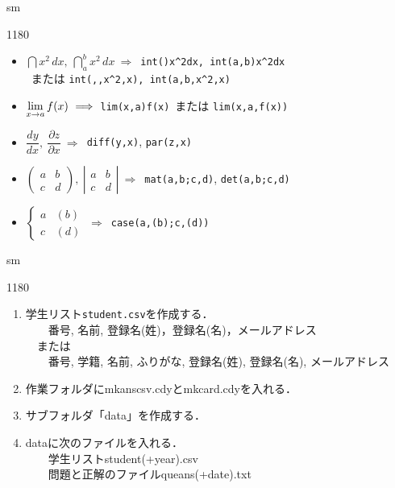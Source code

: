 \documentclass[landscape,10pt]{ujarticle}
\newcommand{\slidepage}[1][s]{%
\setcounter{ketpicctra}{18}%
\if#1m \setcounter{ketpicctra}{1}\fi
\hypersetup{linkcolor=black}%

\begin{layer}{118}{0}
\putnotee{122}{-\theketpicctra.05}{\small\thepage/\pageref{pageend}}
\end{layer}\hypersetup{linkcolor=blue}

}
\begin{document}
\slidepage
\begin{itemize}
\item
{}$\dint x^2\,dx,\ \dint_a^b x^2\,dx \ \Longrightarrow$\ \verb|int()x^2dx, int(a,b)x^2dx|\vspace{-2mm}\\
\ または \verb|int(,,x^2,x), int(a,b,x^2,x)|\vspace{-2mm}
\item
{}$\dlim_{x \to a}f(x) \ \Longrightarrow$\ \verb|lim(x,a)f(x)|\ または \verb|lim(x,a,f(x))|\vspace{-2mm}
\item
{}$\dfrac{dy}{dx},\ \dfrac{\partial z}{\partial x} \ \Longrightarrow$\ \verb|diff(y,x)|, \verb|par(z,x)|
\item
{}$\begin{pmatrix}a&b\\c&d\end{pmatrix},\ \left|\begin{array}{cc}a&b\\c&d\end{array}\right|
\ \Longrightarrow$\ \verb|mat(a,b;c,d)|, \verb|det(a,b;c,d)|\vspace{-2mm}
\item
{}$\begin{cases}a&(b)\\c&(d)\end{cases} \ \Longrightarrow$\ \verb|case(a,(b);c,(d))|\vspace{-2mm}
\end{itemize}



\vspace*{18mm}

\slidepage
\begin{enumerate}[(1)]
\item
学生リスト\verb|student.csv|を作成する．\\
　　番号, 名前, 登録名(姓)，登録名(名)，メールアドレス\\
　または\\
　　番号, 学籍, 名前, ふりがな, 登録名(姓), 登録名(名), メールアドレス
\item
作業フォルダにmkanscsv.cdyとmkcard.cdyを入れる．
\item
サブフォルダ「data」を作成する．
\item
dataに次のファイルを入れる．\\
　　学生リストstudent(+year).csv\\
　　問題と正解のファイルqueans(+date).txt
\end{enumerate}
\end{document}
